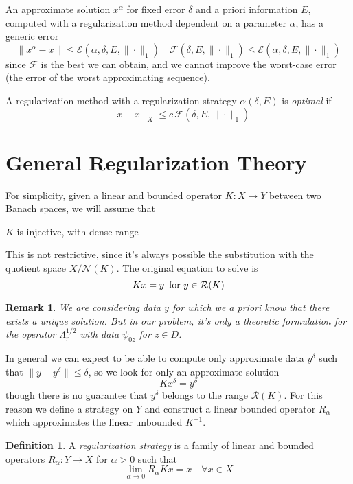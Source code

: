 \documentclass[10pt, a4paper, twoside, openright]{book}
\theoremstyle{definition}
\newtheorem{definition}[subsection]{Definition}
\theoremstyle{plain}
\theoremstyle{plain}
\theoremstyle{plain}
\theoremstyle{plain}
\newtheorem{remark}[subsection]{Remark}
\theoremstyle{plain}
\theoremstyle{plain}
\theoremstyle{plain}
\theoremstyle{plain}
\begin{document}
An approximate solution $x^\alpha$ for fixed error $\delta$ and a priori information $E$, computed with a regularization method dependent on a parameter $\alpha$, has a generic error
\begin{equation}
 \|x^\alpha -x\| \leq \mathcal{E}(\alpha, \delta, E, \|\cdot\|_1) \quad \mathcal{F}(\delta, E, \|\cdot\|_1)\leq\mathcal{E}(\alpha, \delta, E, \|\cdot\|_1)
\end{equation}
since $\mathcal{F}$ is the best we can obtain, and we cannot improve the worst-case error (the error of the worst approximating sequence).
\par
A regularization method with a regularization strategy $\alpha(\delta, E)$ is \emph{optimal} if 
\begin{equation}
 \|\tilde{x} - x\|_X \leq c\,\mathcal{F}(\delta, E, \|\cdot\|_1)
\end{equation}

\section{General Regularization Theory}
For simplicity, given a linear and bounded operator $K:X\to Y$ between two Banach spaces, we will assume that
\begin{center}
 $K$ is injective, with dense range
\end{center}
This is not restrictive, since it's always possible the substitution with the quotient space $X/ \mathcal{N}(K)$. The original equation to solve is
\begin{equation}
 Kx=y\,\textup{ for }y\in \mathcal{R}(K)
\end{equation}
\begin{remark}
 We are considering data $y$ for which we a priori know that there exists a unique solution. But in our problem, it's only a theoretic formulation for the operator $\Lambda_r^{1/2}$ with data $\psi_{0z}$ for $z\in D$.
\end{remark}
In general we can expect to be able to compute only approximate data $y^\delta$ such that $\|y - y^\delta\| \leq \delta$, so we look for only an approximate solution
\begin{equation}
 Kx^\delta = y^\delta
\end{equation}
though there is no guarantee that $y^\delta$ belongs to the range $\mathcal{R}(K)$. For this reason we define a strategy on $Y$ and construct a linear bounded operator $R_\alpha$ which approximates the linear unbounded $K^{-1}$.
\begin{definition}
 A \emph{regularization strategy} is a family of linear and bounded operators $R_\alpha : Y \to X$  for $\alpha> 0$ such that
 \begin{equation}
  \lim_{\alpha\to 0}R_\alpha Kx = x\quad \forall x \in X
 \end{equation}
\end{definition}
\end{document}
